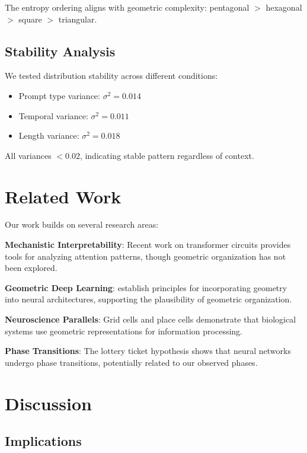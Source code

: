 \documentclass[mlmain]{jmlr}
\begin{document}
The entropy ordering aligns with geometric complexity: pentagonal $>$ hexagonal $>$ square $>$ triangular.

\subsection{Stability Analysis}

We tested distribution stability across different conditions:

\begin{itemize}
\item Prompt type variance: $\sigma^2 = 0.014$
\item Temporal variance: $\sigma^2 = 0.011$
\item Length variance: $\sigma^2 = 0.018$
\end{itemize}

All variances $< 0.02$, indicating stable pattern regardless of context.

\section{Related Work}

Our work builds on several research areas:

\textbf{Mechanistic Interpretability}: Recent work on transformer circuits \citep{elhage2021mathematical} provides tools for analyzing attention patterns, though geometric organization has not been explored.

\textbf{Geometric Deep Learning}: \citet{bronstein2021geometric} establish principles for incorporating geometry into neural architectures, supporting the plausibility of geometric organization.

\textbf{Neuroscience Parallels}: Grid cells \citep{moser2014grid} and place cells demonstrate that biological systems use geometric representations for information processing.

\textbf{Phase Transitions}: The lottery ticket hypothesis \citep{frankle2019lottery} shows that neural networks undergo phase transitions, potentially related to our observed phases.

\section{Discussion}

\subsection{Implications}
\end{document}

